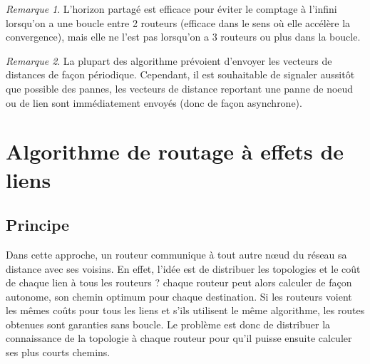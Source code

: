 \documentclass[11pt,english,french]{scrreprt}
\theoremstyle{remark}
\newtheorem*{rem*}{Remarque}
\theoremstyle{definition}
\begin{document}
\begin{rem*}
	L'horizon partagé est efficace pour éviter le comptage à l'infini lorsqu'on a une boucle entre 2 routeurs (efficace dans le sens où elle accélère la convergence), mais elle ne l'est pas lorsqu'on a 3 routeurs ou plus dans la boucle.
\end{rem*}

\begin{rem*}
	La plupart des algorithme prévoient d'envoyer les vecteurs de distances de façon périodique. Cependant, il est souhaitable de signaler aussitôt que possible des pannes, les vecteurs de distance reportant une panne de noeud ou de lien sont immédiatement envoyés (donc de façon asynchrone).
\end{rem*}

\section{Algorithme de routage à effets de liens} %

\subsection{Principe} %

Dans cette approche, un routeur communique à tout autre nœud du réseau sa distance avec ses voisins. En effet, l'idée est de distribuer les topologies et le coût de chaque lien à tous les routeurs ? chaque routeur peut alors calculer de façon autonome, son chemin optimum pour chaque destination. Si les routeurs voient les mêmes coûts pour tous les liens et s'ils utilisent le même algorithme, les routes obtenues sont garanties sans boucle. Le problème est donc de distribuer la connaissance de la topologie à chaque routeur pour qu'il puisse ensuite calculer ses plus courts chemins.
\end{document}
